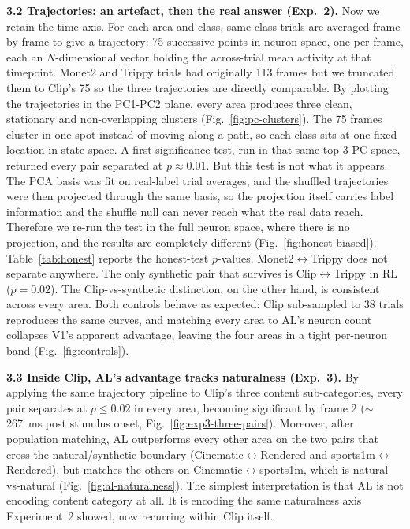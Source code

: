 \documentclass[11pt,a4paper]{article}
\begin{document}
\textbf{3.2 Trajectories: an artefact, then the real answer (Exp.~2).} Now we retain the time axis. For each area and class, same-class trials are averaged frame by frame to give a trajectory: 75 successive points in neuron space, one per frame, each an $N$-dimensional vector holding the across-trial mean activity at that timepoint. Monet2 and Trippy trials had originally 113 frames but we truncated them to Clip's 75 so the three trajectories are directly comparable. By plotting the trajectories in the PC1-PC2 plane, every area produces three clean, stationary and non-overlapping clusters (Fig.~\ref{fig:pc-clusters}). The 75 frames cluster in one spot instead of moving along a path, so each class sits at one fixed location in state space. A first significance test, run in that same top-3 PC space, returned every pair separated at $p \approx 0.01$. But this test is not what it appears. The PCA basis was fit on real-label trial averages, and the shuffled trajectories were then projected through the same basis, so the projection itself carries label information and the shuffle null can never reach what the real data reach. Therefore we re-run the test in the full neuron space, where there is no projection, and the results are completely different (Fig.~\ref{fig:honest-biased}). Table~\ref{tab:honest} reports the honest-test $p$-values. Monet2$\leftrightarrow$Trippy does not separate anywhere. The only synthetic pair that survives is Clip$\leftrightarrow$Trippy in RL ($p=0.02$). The Clip-vs-synthetic distinction, on the other hand, is consistent across every area. Both controls behave as expected: Clip sub-sampled to 38 trials reproduces the same curves, and matching every area to AL's neuron count collapses V1's apparent advantage, leaving the four areas in a tight per-neuron band (Fig.~\ref{fig:controls}).

\textbf{3.3 Inside Clip, AL's advantage tracks naturalness (Exp.~3).} By applying the same trajectory pipeline to Clip's three content sub-categories, every pair separates at $p \leq 0.02$ in every area, becoming significant by frame 2 ($\sim$267~ms post stimulus onset, Fig.~\ref{fig:exp3-three-pairs}). Moreover, after population matching, AL outperforms every other area on the two pairs that cross the natural/synthetic boundary (Cinematic$\leftrightarrow$Rendered and sports1m$\leftrightarrow$Rendered), but matches the others on Cinematic$\leftrightarrow$sports1m, which is natural-vs-natural (Fig.~\ref{fig:al-naturalness}). The simplest interpretation is that AL is not encoding content category at all. It is encoding the same naturalness axis Experiment~2 showed, now recurring within Clip itself.
\end{document}
